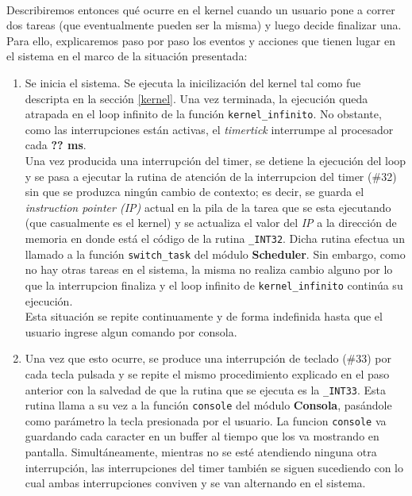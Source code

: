 \documentclass[11pt, a4paper]{article}
\begin{document}
	\paragraph{}
	Describiremos entonces qué ocurre en el kernel cuando un usuario pone a correr dos tareas (que eventualmente pueden ser la misma) y luego decide finalizar una. Para ello, explicaremos paso por paso los eventos y acciones que tienen lugar en el sistema en el marco de la situación presentada:
	\begin{enumerate}
		\item Se inicia el sistema. Se ejecuta la inicilización del kernel tal como fue descripta en la sección  \ref{kernel}. Una vez terminada, la ejecución queda atrapada en el loop infinito de la función \texttt{kernel\_infinito}. No obstante, como las interrupciones están activas, el \textit{timertick} interrumpe al procesador cada \textbf{?? ms}.\\
		Una vez producida una interrupción del timer, se detiene la ejecución del loop y se pasa a ejecutar la rutina de atención de la interrupcion del timer (\#32) sin que se produzca ningún cambio de contexto; es decir, se guarda el \textit{instruction pointer (IP)} actual en la pila de la tarea que se esta ejecutando (que casualmente es el kernel) y se actualiza el valor del \textit{IP} a la dirección de memoria en donde está el código de la rutina \texttt{\_INT32}. Dicha rutina efectua un llamado a la función \texttt{switch\_task} del módulo \textbf{Scheduler}. Sin embargo, como no hay otras tareas en el sistema, la misma no realiza cambio alguno por lo que la interrupcion finaliza y el loop infinito de \texttt{kernel\_infinito} continúa su ejecución.\\
		Esta situación se repite continuamente y de forma indefinida hasta que el usuario ingrese algun comando por consola.
		\item Una vez que esto ocurre, se produce una interrupción de teclado (\#33) por cada tecla pulsada y se repite el mismo procedimiento explicado en el paso anterior con la salvedad de que la rutina que se ejecuta es la \texttt{\_INT33}. Esta rutina llama a su vez a la función \texttt{console} del módulo \textbf{Consola}, pasándole como parámetro la tecla presionada por el usuario. La funcion \texttt{console} va guardando cada caracter en un buffer al tiempo que los va mostrando en pantalla. Simultáneamente, mientras no se esté atendiendo ninguna otra interrupción, las interrupciones del timer también se siguen sucediendo con lo cual ambas interrupciones conviven y se van alternando en el sistema. \\

\end{enumerate}
\end{document}
